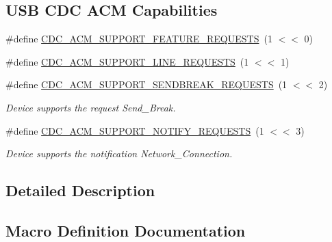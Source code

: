 \subsection*{U\+SB C\+DC A\+CM Capabilities}
\begin{DoxyCompactItemize}
\item 
\#define \hyperlink{group__cdc__protocol__group_gab1dab8b998f3a80f796edaf74567d4a7}{C\+D\+C\+\_\+\+A\+C\+M\+\_\+\+S\+U\+P\+P\+O\+R\+T\+\_\+\+F\+E\+A\+T\+U\+R\+E\+\_\+\+R\+E\+Q\+U\+E\+S\+TS}~(1 $<$$<$ 0)
\item 
\#define \hyperlink{group__cdc__protocol__group_gacba280f60d9dacf049a41a6711b1e9b2}{C\+D\+C\+\_\+\+A\+C\+M\+\_\+\+S\+U\+P\+P\+O\+R\+T\+\_\+\+L\+I\+N\+E\+\_\+\+R\+E\+Q\+U\+E\+S\+TS}~(1 $<$$<$ 1)
\item 
\mbox{\label{group__cdc__protocol__group_ga5e20369c655ed417fb699944b064ebdc}} 
\#define \hyperlink{group__cdc__protocol__group_ga5e20369c655ed417fb699944b064ebdc}{C\+D\+C\+\_\+\+A\+C\+M\+\_\+\+S\+U\+P\+P\+O\+R\+T\+\_\+\+S\+E\+N\+D\+B\+R\+E\+A\+K\+\_\+\+R\+E\+Q\+U\+E\+S\+TS}~(1 $<$$<$ 2)
\begin{DoxyCompactList}\small\item\em Device supports the request Send\+\_\+\+Break. \end{DoxyCompactList}\item 
\mbox{\label{group__cdc__protocol__group_gac7cc3782b884395213a99ffae74b159f}} 
\#define \hyperlink{group__cdc__protocol__group_gac7cc3782b884395213a99ffae74b159f}{C\+D\+C\+\_\+\+A\+C\+M\+\_\+\+S\+U\+P\+P\+O\+R\+T\+\_\+\+N\+O\+T\+I\+F\+Y\+\_\+\+R\+E\+Q\+U\+E\+S\+TS}~(1 $<$$<$ 3)
\begin{DoxyCompactList}\small\item\em Device supports the notification Network\+\_\+\+Connection. \end{DoxyCompactList}\end{DoxyCompactItemize}


\subsection{Detailed Description}


\subsection{Macro Definition Documentation}
\mbox{\label{group__cdc__protocol__group_gab1dab8b998f3a80f796edaf74567d4a7}} 
